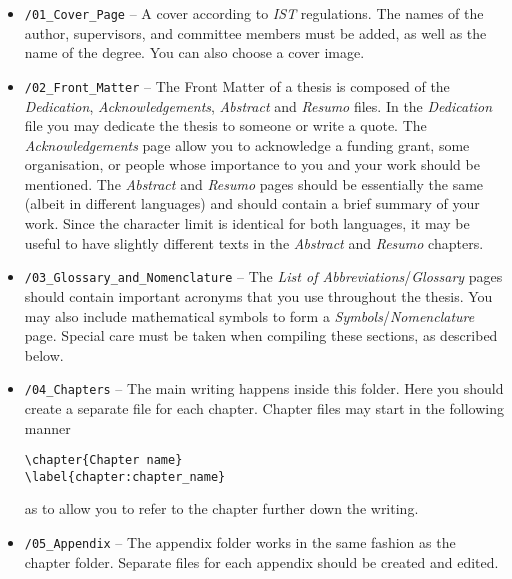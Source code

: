 \begin{itemize}
\item \texttt{/01\_Cover\_Page} -- A cover according to \textit{IST} regulations. The names of the author, supervisors, and committee members must be added, as well as the name of the degree. You can also choose a cover image.

\item \texttt{/02\_Front\_Matter} -- The Front Matter of a thesis is composed of the \textit{Dedication}, \textit{Acknowledgements}, \textit{Abstract} and \textit{Resumo} files. In the \textit{Dedication} file you may dedicate the thesis to someone or write a quote. The \textit{Acknowledgements} page allow you to acknowledge a funding grant, some organisation, or people whose importance to you and your work should be mentioned. The \textit{Abstract} and \textit{Resumo} pages should be essentially the same (albeit in different languages) and should contain a brief summary of your work. Since the character limit is identical for both languages, it may be useful to have slightly different texts in the \textit{Abstract} and \textit{Resumo} chapters.

\item \texttt{/03\_Glossary\_and\_Nomenclature} -- The \textit{List of Abbreviations}/\textit{Glossary} pages should contain important acronyms that you use throughout the thesis. You may also include mathematical symbols to form a \textit{Symbols}/\textit{Nomenclature} page. Special care must be taken when compiling these sections, as described below.

\item \texttt{/04\_Chapters} -- The main writing happens inside this folder. Here you should create a separate file for each chapter. Chapter files may start in the following manner

\begin{verbatim}
\chapter{Chapter name}
\label{chapter:chapter_name}
\end{verbatim}


\noindent as to allow you to refer to the chapter further down the writing.

\item \texttt{/05\_Appendix} -- The appendix folder works in the same fashion as the chapter folder. Separate files for each appendix should be created and edited.
\end{itemize}


